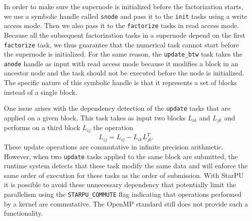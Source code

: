 \documentclass{article}
\begin{document}
In order to make sure the supernode is initialized before the
factorization starts, we use a symbolic handle called \texttt{snode}
and pass it to the \texttt{init} tasks using a write access mode. Then
we also pass it to the \texttt{factorize} tasks in read access
mode. Because all the subsequent factorization tasks in a supernode
depend on the first \texttt{factorize} task, we thus guarantee that
the numerical task cannot start before the supernode is
initialized. For the same reason, the \texttt{update\_btw} task takes
the \texttt{anode} handle as input with read access mode because it
modifies a block in an ancestor node and the task should not be
executed before the node is initialized. The specific nature of this
symbolic handle is that it represents a set of blocks instead of a
single block.

One issue arises with the dependency detection of the \texttt{update}
tasks that are applied on a given block. This task takes as input two
blocks $L_{ik}$ and $L_{jk}$ and performs on a third block $L_{ij}$
the operation
\begin{equation*}
  L_{ij} = L_{ij} - L_{ik}L_{jk}^{T}.
\end{equation*}
These update operations are commutative in infinite precision
arithmetic.  However, when two \texttt{update} tasks applied to the
same block are submitted, the runtime system detects that these task
modify the same data and will enforce the same order of execution for
these tasks as the order of submission. With StarPU it is possible to
avoid these unnecessary dependency that potentially limit the
parallelism using the \texttt{STARPU\_COMMUTE} flag indicating that
operations performed by a kernel are commutative. The OpenMP standard
still does not provide such a functionality.
\end{document}
